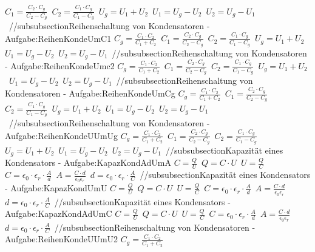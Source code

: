 $ C_{1}  = \frac{C_{2} \cdot C_{g} }{C_{2} -C_{g} } $\ 
$ C_{2}  = \frac{C_{1} \cdot C_{g} }{C_{1} -C_{g} } $\ 
$ U_{g}  = U_{1}  + U_{2} $\ 
$ U_{1}  = U_{g}  - U_{2} $\ 
$ U_{2}  = U_{g}  - U_{1} $\ 
//subsubsection{Reihenschaltung von Kondensatoren - Aufgabe:ReihenKondeUmC1} 
$ C_{g}  = \frac{C_{1} \cdot C_{2} }{C_{1} +C_{2} } $\ 
$ C_{1}  = \frac{C_{2} \cdot C_{g} }{C_{2} -C_{g} } $\ 
$ C_{2}  = \frac{C_{1} \cdot C_{g} }{C_{1} -C_{g} } $\ 
$ U_{g}  = U_{1}  + U_{2} $\ 
$ U_{1}  = U_{g}  - U_{2} $\ 
$ U_{2}  = U_{g}  - U_{1} $\ 
//subsubsection{Reihenschaltung von Kondensatoren - Aufgabe:ReihenKondeUmc2} 
$ C_{g}  = \frac{C_{1} \cdot C_{2} }{C_{1} +C_{2} } $\ 
$ C_{1}  = \frac{C_{2} \cdot C_{g} }{C_{2} -C_{g} } $\ 
$ C_{2}  = \frac{C_{1} \cdot C_{g} }{C_{1} -C_{g} } $\ 
$ U_{g}  = U_{1}  + U_{2} $\ 
$ U_{1}  = U_{g}  - U_{2} $\ 
$ U_{2}  = U_{g}  - U_{1} $\ 
//subsubsection{Reihenschaltung von Kondensatoren - Aufgabe:ReihenKondeUmCg} 
$ C_{g}  = \frac{C_{1} \cdot C_{2} }{C_{1} +C_{2} } $\ 
$ C_{1}  = \frac{C_{2} \cdot C_{g} }{C_{2} -C_{g} } $\ 
$ C_{2}  = \frac{C_{1} \cdot C_{g} }{C_{1} -C_{g} } $\ 
$ U_{g}  = U_{1}  + U_{2} $\ 
$ U_{1}  = U_{g}  - U_{2} $\ 
$ U_{2}  = U_{g}  - U_{1} $\ 
//subsubsection{Reihenschaltung von Kondensatoren - Aufgabe:ReihenKondeUUmUg} 
$ C_{g}  = \frac{C_{1} \cdot C_{2} }{C_{1} +C_{2} } $\ 
$ C_{1}  = \frac{C_{2} \cdot C_{g} }{C_{2} -C_{g} } $\ 
$ C_{2}  = \frac{C_{1} \cdot C_{g} }{C_{1} -C_{g} } $\ 
$ U_{g}  = U_{1}  + U_{2} $\ 
$ U_{1}  = U_{g}  - U_{2} $\ 
$ U_{2}  = U_{g}  - U_{1} $\ 
//subsubsection{Kapazität eines Kondensators - Aufgabe:KapazKondAdUmA} 
$ C = \frac{Q}{U} $\ 
$ Q = C\cdot U $\ 
$ U = \frac{Q}{C} $\ 
$ C = \epsilon _{0} \cdot \epsilon _{r} \cdot \frac{A}{d} $\ 
$ A = \frac{C\cdot d}{\epsilon _{0} \epsilon _{r} } $\ 
$ d = \epsilon _{0} \cdot \epsilon _{r} \cdot \frac{A}{C} $\ 
//subsubsection{Kapazität eines Kondensators - Aufgabe:KapazKondUmU} 
$ C = \frac{Q}{U} $\ 
$ Q = C\cdot U $\ 
$ U = \frac{Q}{C} $\ 
$ C = \epsilon _{0} \cdot \epsilon _{r} \cdot \frac{A}{d} $\ 
$ A = \frac{C\cdot d}{\epsilon _{0} \epsilon _{r} } $\ 
$ d = \epsilon _{0} \cdot \epsilon _{r} \cdot \frac{A}{C} $\ 
//subsubsection{Kapazität eines Kondensators - Aufgabe:KapazKondAdUmC} 
$ C = \frac{Q}{U} $\ 
$ Q = C\cdot U $\ 
$ U = \frac{Q}{C} $\ 
$ C = \epsilon _{0} \cdot \epsilon _{r} \cdot \frac{A}{d} $\ 
$ A = \frac{C\cdot d}{\epsilon _{0} \epsilon _{r} } $\ 
$ d = \epsilon _{0} \cdot \epsilon _{r} \cdot \frac{A}{C} $\ 
//subsubsection{Reihenschaltung von Kondensatoren - Aufgabe:ReihenKondeUUmU2} 
$ C_{g}  = \frac{C_{1} \cdot C_{2} }{C_{1} +C_{2} } $\ 
